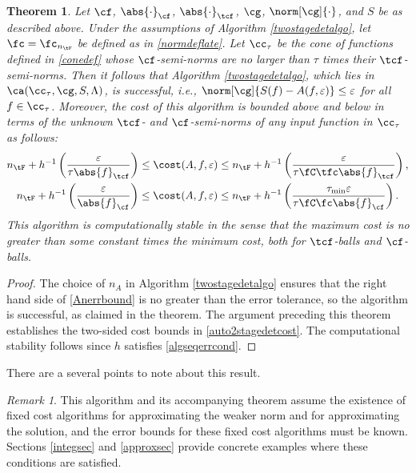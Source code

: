 \documentclass[]{elsarticle}
\newtheorem{theorem}{Theorem}
\theoremstyle{definition}
\theoremstyle{remark}
\newtheorem{rem}{Remark}
\newcommand{\Fnorm}[1]{\abs{#1}_{\cf}}
\newcommand{\Ftnorm}[1]{\abs{#1}_{\tcf}}
\newcommand{\Gnorm}[1]{\norm[\cg]{#1}}
\begin{document}
\begin{theorem}  \label{TwoStageDetermThm}  Let $\cf$, $\Fnorm{\cdot}$, $\Ftnorm{\cdot}$, $\cg$, $\Gnorm{\cdot}$, and $S$ be as described above.  Under the assumptions of Algorithm  \ref{twostagedetalgo}, let $\fc=\fc_{n_{\tF}}$ be defined as in \eqref{normdeflate}.
Let $\cc_\tau$ be the cone of functions defined in \eqref{conedef} whose $\cf$-semi-norms are no larger than $\tau$ times their $\tcf$-semi-norms.  Then it follows that Algorithm \ref{twostagedetalgo}, which lies in $\ca(\cc_{\tau},\cg,S,\Lambda)$, is successful,  i.e.,  $\norm[\cg]{S(f)-A(f,\varepsilon)} \le \varepsilon$ for all $f \in \cc_\tau$.  Moreover, the cost of this algorithm is bounded above and below in terms of the unknown $\tcf$- and $\cf$-semi-norms of any input function in $\cc_{\tau}$ as follows:
\begin{subequations}  \label{auto2stagedetcost}
\begin{gather}
n_{\tF}+ h^{-1}\left(\frac{\varepsilon}{\tau \Ftnorm{f}} \right) \le 
\cost(A,f,\varepsilon)
\le n_{\tF}+ h^{-1}\left(\frac{\varepsilon}{\tau \fC\tfc\Ftnorm{f}}\right), \\
n_{\tF}+ h^{-1}\left(\frac{\varepsilon}{\Fnorm{f}} \right) \le \cost(A,f,\varepsilon)
\le n_{\tF}+h^{-1}\left(\frac{\tau_{\min}\varepsilon}{\tau \fC\fc\Fnorm{f}}\right).
\end{gather}
\end{subequations}
This algorithm is computationally stable in the sense that the maximum cost is no greater than some constant times the minimum cost, both for $\tcf$-balls and $\cf$-balls.
\end{theorem}

\begin{proof} The choice of $n_A$ in Algorithm \ref{twostagedetalgo} ensures that the right hand side of \eqref{Anerrbound} is no greater than the error tolerance, so the algorithm is successful, as claimed in the theorem.  The argument preceding this theorem establishes the two-sided cost bounds in \eqref{auto2stagedetcost}. The computational stability follows since $h$ satisfies \eqref{algseqerrcond}.
\end{proof}

There are a several points to note about this result.

\begin{rem} This algorithm and its accompanying theorem assume the existence of fixed cost algorithms for approximating the weaker norm and for approximating the solution, and the error bounds for these fixed cost algorithms must be known. Sections \ref{integsec} and \ref{approxsec} provide concrete examples where these conditions are satisfied.
\end{rem}
\end{document}
